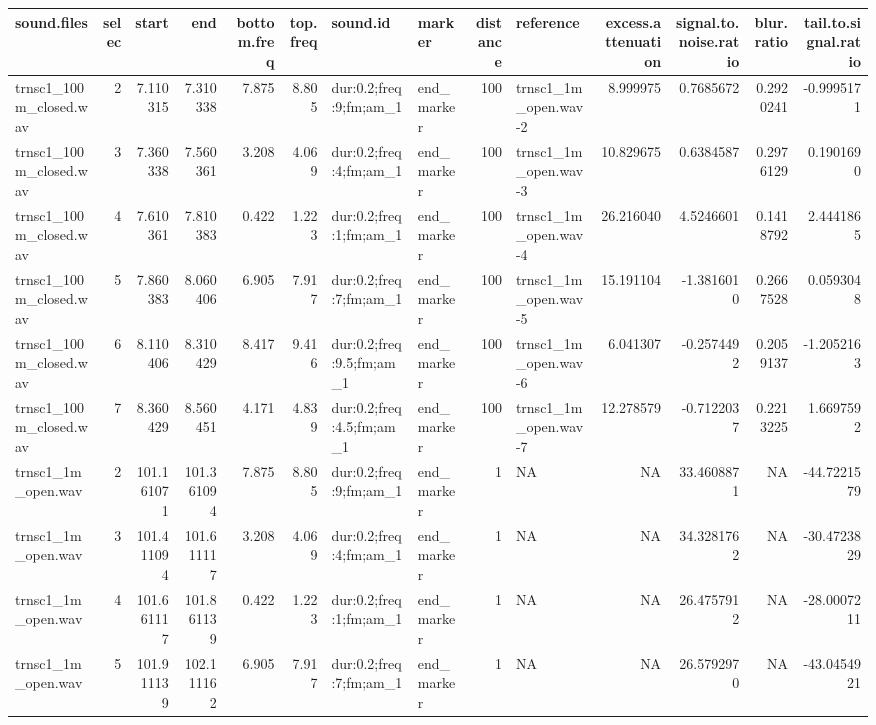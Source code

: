 \documentclass[
  letterpaper,
  DIV=11,
  numbers=noendperiod]{scrartcl}
\begin{document}
\begin{landscape}
\begin{longtable*}[t]{lrrrrrllrlrrrr}
\toprule
sound.files & selec & start & end & bottom.freq & top.freq & sound.id & marker & distance & reference & excess.attenuation & signal.to.noise.ratio & blur.ratio & tail.to.signal.ratio\\
\midrule
trnsc1\_100m\_closed.wav & 2 & 7.110315 & 7.310338 & 7.875 & 8.805 & dur:0.2;freq:9;fm;am\_1 & end\_marker & 100 & trnsc1\_1m\_open.wav-2 & 8.999975 & 0.7685672 & 0.2920241 & -0.9995171\\
trnsc1\_100m\_closed.wav & 3 & 7.360338 & 7.560361 & 3.208 & 4.069 & dur:0.2;freq:4;fm;am\_1 & end\_marker & 100 & trnsc1\_1m\_open.wav-3 & 10.829675 & 0.6384587 & 0.2976129 & 0.1901690\\
trnsc1\_100m\_closed.wav & 4 & 7.610361 & 7.810383 & 0.422 & 1.223 & dur:0.2;freq:1;fm;am\_1 & end\_marker & 100 & trnsc1\_1m\_open.wav-4 & 26.216040 & 4.5246601 & 0.1418792 & 2.4441865\\
trnsc1\_100m\_closed.wav & 5 & 7.860383 & 8.060406 & 6.905 & 7.917 & dur:0.2;freq:7;fm;am\_1 & end\_marker & 100 & trnsc1\_1m\_open.wav-5 & 15.191104 & -1.3816010 & 0.2667528 & 0.0593048\\
trnsc1\_100m\_closed.wav & 6 & 8.110406 & 8.310429 & 8.417 & 9.416 & dur:0.2;freq:9.5;fm;am\_1 & end\_marker & 100 & trnsc1\_1m\_open.wav-6 & 6.041307 & -0.2574492 & 0.2059137 & -1.2052163\\
\addlinespace
trnsc1\_100m\_closed.wav & 7 & 8.360429 & 8.560451 & 4.171 & 4.839 & dur:0.2;freq:4.5;fm;am\_1 & end\_marker & 100 & trnsc1\_1m\_open.wav-7 & 12.278579 & -0.7122037 & 0.2213225 & 1.6697592\\
trnsc1\_1m\_open.wav & 2 & 101.161071 & 101.361094 & 7.875 & 8.805 & dur:0.2;freq:9;fm;am\_1 & end\_marker & 1 & NA & NA & 33.4608871 & NA & -44.7221579\\
trnsc1\_1m\_open.wav & 3 & 101.411094 & 101.611117 & 3.208 & 4.069 & dur:0.2;freq:4;fm;am\_1 & end\_marker & 1 & NA & NA & 34.3281762 & NA & -30.4723829\\
trnsc1\_1m\_open.wav & 4 & 101.661117 & 101.861139 & 0.422 & 1.223 & dur:0.2;freq:1;fm;am\_1 & end\_marker & 1 & NA & NA & 26.4757912 & NA & -28.0007211\\
trnsc1\_1m\_open.wav & 5 & 101.911139 & 102.111162 & 6.905 & 7.917 & dur:0.2;freq:7;fm;am\_1 & end\_marker & 1 & NA & NA & 26.5792970 & NA & -43.0454921\\
\bottomrule
\end{longtable*}
\end{landscape}
\end{document}
